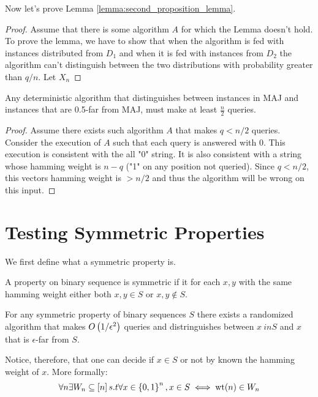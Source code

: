 Now let's prove Lemma \ref{lemma:second_proposition_lemma}.
\begin{proof}
    Assume that there is some algorithm \(A\) for which the Lemma doesn't hold.
    To prove the lemma, we have to show that when the algorithm is fed with instances distributed from \(D_1\) and when it is fed with instances from \(D_2\) the algorithm can't distinguish between the two distributions with probability greater than \(q/n\).
    Let $X_n$
\end{proof}

\begin{proposition}
    Any deterministic algorithm that distinguishes between instances in MAJ and instances that are 0.5-far from MAJ, must make at least \(\frac{n}{2}\) queries.
\end{proposition}

\begin{proof}
    Assume there exists such algorithm \(A\) that makes \(q < n/2\) queries.
    Consider the execution of \(A\) such that each query is answered with 0. 
    This execution is consistent with the all "0" string.
    It is also consistent with a string whose hamming weight is \(n-q\) ("1" on any position not queried).
    Since \(q<n/2\), this vectors hamming weight is \(>n/2\) and thus the algorithm will be wrong on this input.
\end{proof}

\section{Testing Symmetric Properties}

We first define what a symmetric property is.
\begin{definition}
    A property on binary sequence is symmetric if it for each \(x,y\) with the same hamming weight either both \(x,y \in S\) or \(x,y \not \in S\).
\end{definition}

\begin{theorem}
    For any symmetric property of binary sequences \(S\) there exists a randomized algorithm that makes \(O\left(1/\epsilon^2\right)\) queries and distringuishes between \(x \ in S\) and \(x\) that is \(\epsilon\)-far from \(S\).
\end{theorem}

Notice, therefore, that one can decide if \(x \in S\) or not by known the hamming weight of \(x\).
More formally: 
\[
    \forall n \exists W_n \subseteq \left[n\right] s.t \forall x \in \left\{0,1\right\}^n, x\in S \iff \text{wt}(n) \in W_n
\]


